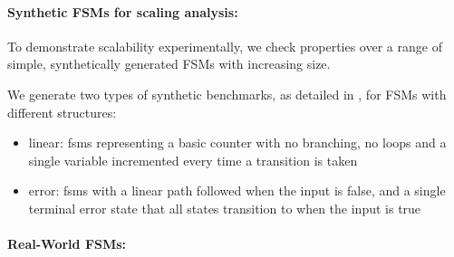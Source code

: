 \documentclass[acmsmall,screen,review]{acmart}
\begin{document}
\paragraph{Synthetic FSMs for scaling analysis:}
To demonstrate scalability experimentally, we check properties over a range of simple, synthetically generated FSMs with increasing size. 

We generate two types of synthetic benchmarks, as detailed in , for FSMs with different structures: 
\begin{itemize}
  \item linear: \acp{fsm} representing a basic counter with no branching, no loops and a 
  single variable incremented every time a transition is taken
  \item error: \acp{fsm} with a linear path followed when the input is false, and a single 
  terminal error state that all states transition to when the input is true
\end{itemize}

\paragraph{Real-World FSMs:}
\label{rw-para}
\end{document}
